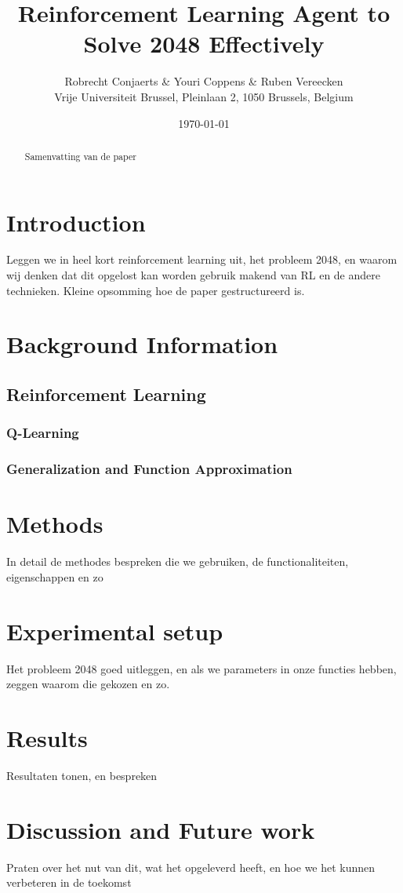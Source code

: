 \documentclass[a4paper,12pt]{article}
\begin{document}
\title{Reinforcement Learning Agent to Solve 2048 Effectively}
\author{
Robrecht Conjaerts \& Youri Coppens \& Ruben Vereecken \\
Vrije Universiteit Brussel, Pleinlaan 2, 1050 Brussels, Belgium \\
}
\date{\today}
\maketitle

\begin{abstract}
Samenvatting van de paper
\end{abstract}

\section{Introduction}
Leggen we in heel kort reinforcement learning uit, het probleem 2048, en waarom wij denken dat dit opgelost kan worden gebruik makend van RL en de andere technieken. Kleine opsomming hoe de paper gestructureerd is.
\section{Background Information}
\cite{sutton1998rl}
\subsection{Reinforcement Learning}
\subsubsection{Q-Learning}
\subsubsection{Generalization and Function Approximation}
\section{Methods}
In detail de methodes bespreken die we gebruiken, de functionaliteiten, eigenschappen en zo
\section{Experimental setup}
Het probleem 2048 goed uitleggen, en als we parameters in onze functies hebben, zeggen waarom die gekozen en zo.
\section{Results}
Resultaten tonen, en bespreken
\section{Discussion and Future work}
Praten over het nut van dit, wat het opgeleverd heeft, en hoe we het kunnen verbeteren in de toekomst



\end{document}
